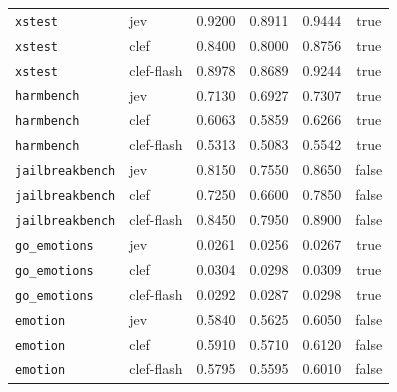 \begin{table}[htbp]
\begin{tabular}{@{}llrrrc@{}}
\texttt{xstest} & jev & 0.9200 & 0.8911 & 0.9444 & true \\
\texttt{xstest} & clef & 0.8400 & 0.8000 & 0.8756 & true \\
\texttt{xstest} & clef-flash & 0.8978 & 0.8689 & 0.9244 & true \\
\texttt{harmbench} & jev & 0.7130 & 0.6927 & 0.7307 & true \\
\texttt{harmbench} & clef & 0.6063 & 0.5859 & 0.6266 & true \\
\texttt{harmbench} & clef-flash & 0.5313 & 0.5083 & 0.5542 & true \\
\texttt{jailbreakbench} & jev & 0.8150 & 0.7550 & 0.8650 & false \\
\texttt{jailbreakbench} & clef & 0.7250 & 0.6600 & 0.7850 & false \\
\texttt{jailbreakbench} & clef-flash & 0.8450 & 0.7950 & 0.8900 & false \\
\texttt{go\_emotions} & jev & 0.0261 & 0.0256 & 0.0267 & true \\
\texttt{go\_emotions} & clef & 0.0304 & 0.0298 & 0.0309 & true \\
\texttt{go\_emotions} & clef-flash & 0.0292 & 0.0287 & 0.0298 & true \\
\texttt{emotion} & jev & 0.5840 & 0.5625 & 0.6050 & false \\
\texttt{emotion} & clef & 0.5910 & 0.5710 & 0.6120 & false \\
\texttt{emotion} & clef-flash & 0.5795 & 0.5595 & 0.6010 & false \\
\bottomrule
\end{tabular}
\end{table}

